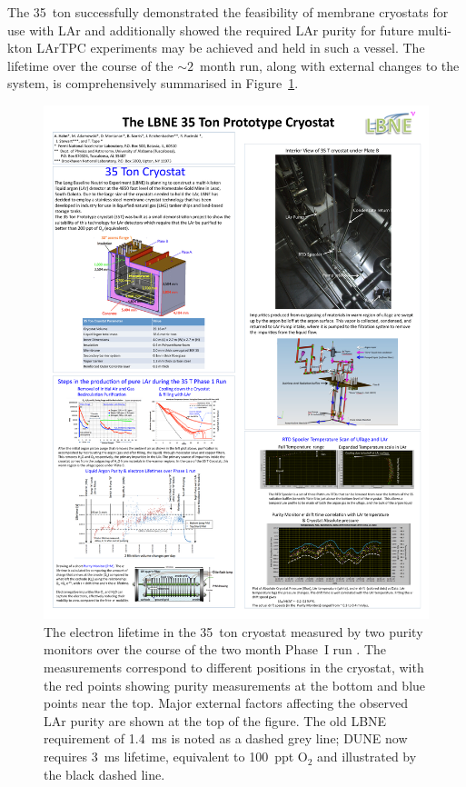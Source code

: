 The 35~ton successfully demonstrated the feasibility of membrane cryostats for use with LAr and additionally showed the required LAr purity for future multi-kton LArTPC experiments may be achieved and held in such a vessel.  The lifetime over the course of the $\sim2$~month run, along with external changes to the system, is comprehensively summarised in Figure~\ref{fig:35tonPhaseIElectronLifetime}.

\begin{figure}
  \centering
  \includegraphics[width=14cm]{35tonPhaseIElectronLifetime.pdf}
  \caption[The electron lifetime in the 35~ton cryostat measured by two purity monitors over the course of the two month Phase~I run.]{The electron lifetime in the 35~ton cryostat measured by two purity monitors over the course of the two month Phase~I run \cite{35tonPhaseI2014}.  The measurements correspond to different positions in the cryostat, with the red points showing purity measurements at the bottom and blue points near the top.  Major external factors affecting the observed LAr purity are shown at the top of the figure.  The old LBNE requirement of 1.4~ms is noted as a dashed grey line; DUNE now requires 3~ms lifetime, equivalent to 100~ppt O$_2$ and illustrated by the black dashed line.}
  \label{fig:35tonPhaseIElectronLifetime}
\end{figure}

